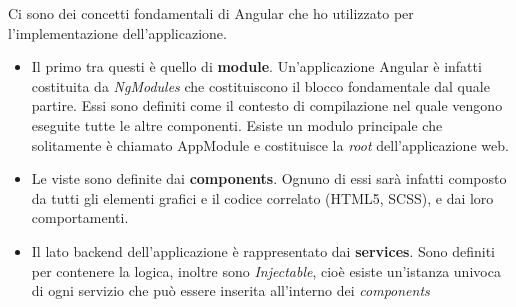 Ci sono dei concetti fondamentali di Angular che ho utilizzato per l'implementazione dell'applicazione.
\begin{itemize}
  \item Il primo tra questi è quello di \textbf{module}. Un'applicazione Angular è infatti costituita da \textit{NgModules} che
  costituiscono il blocco fondamentale dal quale partire. Essi sono definiti come il contesto di compilazione nel quale vengono eseguite
  tutte le altre componenti. Esiste un modulo principale che solitamente è chiamato AppModule e costituisce la \textit{root} dell'applicazione web.
  \item Le viste sono definite dai \textbf{components}. Ognuno di essi sarà infatti composto da tutti gli elementi grafici e il codice
  correlato (HTML5, SCSS), e dai loro comportamenti.
  \item  Il lato \gls{backend} dell'applicazione è rappresentato dai \textbf{services}. Sono definiti per contenere la logica, inoltre sono
  \textit{Injectable}, cioè esiste un'istanza univoca di ogni servizio che può essere inserita all'interno dei \textit{components} 
\end{itemize}